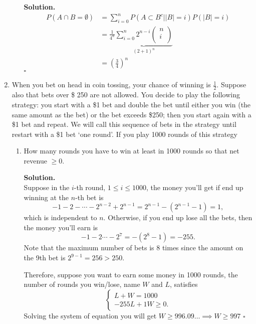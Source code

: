 \documentclass[12pt]{article}
\begin{document}
\begin{enumerate}
\begin{itemize}
    \textbf{Solution.} 
    \begin{equation*}
        \begin{aligned}
            P(A\cap B = \emptyset)  &= \sum_{i=0}^{n} P(A \subset B^c| |B| = i ) P(|B| = i ) \\
             &= \frac{1}{4^n} \underbrace{\sum_{i=0}^{n} 2^{n-i}\begin{pmatrix}
                 n \\
                 i \\
             \end{pmatrix}}_{(2+1)^n} \\
             &= (\frac{3}{4})^n
        \end{aligned}
    \end{equation*}
\hspace{\linewidth}\(\square  \) 
\end{itemize}

\item
When you bet on head in coin tossing, your chance of winning is \(\frac{1}{2}\).
Suppose also that bets over \$ 250 are not allowed.
You decide to play the following strategy: you start with a \$1 bet and double the bet until either you
win (the same amount as the bet) or the bet exceeds \$250;
then you start again with a \$1 bet and repeat. We will call
this sequence of bets in the strategy until restart with a \$1
bet ‘one round’. If you play 1000 rounds of this strategy

\begin{enumerate}
    \item How many rounds you have to win at least in 1000 rounds so that net revenue \(\geq 0\).
    
    \textbf{Solution.} \\ 
    Suppose in the $i$-th round, $1\leq i\leq 1000$, the money you'll get if end up winning at the $n$-th bet is
\begin{equation*}
-1-2-\cdots-2^{n-2}+2^{n-1}=2^{n-1}-(2^{n-1}-1)=1,
\end{equation*}
which is independent to $n$. Otherwise, if you end up lose all the bets, then the money you'll earn is
\begin{equation*}
-1-2\cdots-2^7=-(2^8-1) = -255.
\end{equation*}
Note that the maximum number of bets is $8$ times since the amount on the 9th bet is $2^{9-1} = 256>250$. 

Therefore, suppose you want to earn some money in 1000 rounds, the number of rounds you win/lose, name \(W\) and \(L\), satisfies 
\[
    \begin{cases}
        L + W  = 1000\\
        -255L + 1W \geq  0  .
    \end{cases}
\]  
Solving the system of equation you will get \(W \geq  996.09\dots \implies W \geq 997\) 
\hspace{\linewidth}\({\square}\) 



\end{enumerate}
\end{enumerate}
\end{document}
